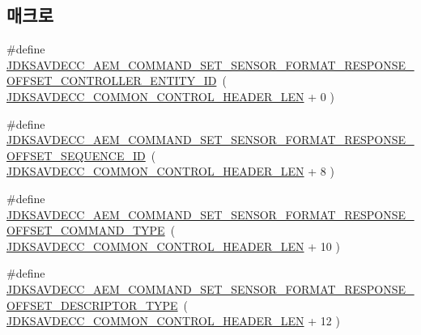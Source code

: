 \subsection*{매크로}
\begin{DoxyCompactItemize}
\item 
\#define \hyperlink{group__command__set__sensor__format__response_gacac541711e84f8ed94b1ff80926d97a6}{J\+D\+K\+S\+A\+V\+D\+E\+C\+C\+\_\+\+A\+E\+M\+\_\+\+C\+O\+M\+M\+A\+N\+D\+\_\+\+S\+E\+T\+\_\+\+S\+E\+N\+S\+O\+R\+\_\+\+F\+O\+R\+M\+A\+T\+\_\+\+R\+E\+S\+P\+O\+N\+S\+E\+\_\+\+O\+F\+F\+S\+E\+T\+\_\+\+C\+O\+N\+T\+R\+O\+L\+L\+E\+R\+\_\+\+E\+N\+T\+I\+T\+Y\+\_\+\+ID}~( \hyperlink{group__jdksavdecc__avtp__common__control__header_gaae84052886fb1bb42f3bc5f85b741dff}{J\+D\+K\+S\+A\+V\+D\+E\+C\+C\+\_\+\+C\+O\+M\+M\+O\+N\+\_\+\+C\+O\+N\+T\+R\+O\+L\+\_\+\+H\+E\+A\+D\+E\+R\+\_\+\+L\+EN} + 0 )
\item 
\#define \hyperlink{group__command__set__sensor__format__response_ga5ef0dd4de647da08fbb01a7267adff5e}{J\+D\+K\+S\+A\+V\+D\+E\+C\+C\+\_\+\+A\+E\+M\+\_\+\+C\+O\+M\+M\+A\+N\+D\+\_\+\+S\+E\+T\+\_\+\+S\+E\+N\+S\+O\+R\+\_\+\+F\+O\+R\+M\+A\+T\+\_\+\+R\+E\+S\+P\+O\+N\+S\+E\+\_\+\+O\+F\+F\+S\+E\+T\+\_\+\+S\+E\+Q\+U\+E\+N\+C\+E\+\_\+\+ID}~( \hyperlink{group__jdksavdecc__avtp__common__control__header_gaae84052886fb1bb42f3bc5f85b741dff}{J\+D\+K\+S\+A\+V\+D\+E\+C\+C\+\_\+\+C\+O\+M\+M\+O\+N\+\_\+\+C\+O\+N\+T\+R\+O\+L\+\_\+\+H\+E\+A\+D\+E\+R\+\_\+\+L\+EN} + 8 )
\item 
\#define \hyperlink{group__command__set__sensor__format__response_ga2e0d6e35a1738a777db991f0492426f8}{J\+D\+K\+S\+A\+V\+D\+E\+C\+C\+\_\+\+A\+E\+M\+\_\+\+C\+O\+M\+M\+A\+N\+D\+\_\+\+S\+E\+T\+\_\+\+S\+E\+N\+S\+O\+R\+\_\+\+F\+O\+R\+M\+A\+T\+\_\+\+R\+E\+S\+P\+O\+N\+S\+E\+\_\+\+O\+F\+F\+S\+E\+T\+\_\+\+C\+O\+M\+M\+A\+N\+D\+\_\+\+T\+Y\+PE}~( \hyperlink{group__jdksavdecc__avtp__common__control__header_gaae84052886fb1bb42f3bc5f85b741dff}{J\+D\+K\+S\+A\+V\+D\+E\+C\+C\+\_\+\+C\+O\+M\+M\+O\+N\+\_\+\+C\+O\+N\+T\+R\+O\+L\+\_\+\+H\+E\+A\+D\+E\+R\+\_\+\+L\+EN} + 10 )
\item 
\#define \hyperlink{group__command__set__sensor__format__response_ga3bb2e7b1633ba4273960ebbb753c6540}{J\+D\+K\+S\+A\+V\+D\+E\+C\+C\+\_\+\+A\+E\+M\+\_\+\+C\+O\+M\+M\+A\+N\+D\+\_\+\+S\+E\+T\+\_\+\+S\+E\+N\+S\+O\+R\+\_\+\+F\+O\+R\+M\+A\+T\+\_\+\+R\+E\+S\+P\+O\+N\+S\+E\+\_\+\+O\+F\+F\+S\+E\+T\+\_\+\+D\+E\+S\+C\+R\+I\+P\+T\+O\+R\+\_\+\+T\+Y\+PE}~( \hyperlink{group__jdksavdecc__avtp__common__control__header_gaae84052886fb1bb42f3bc5f85b741dff}{J\+D\+K\+S\+A\+V\+D\+E\+C\+C\+\_\+\+C\+O\+M\+M\+O\+N\+\_\+\+C\+O\+N\+T\+R\+O\+L\+\_\+\+H\+E\+A\+D\+E\+R\+\_\+\+L\+EN} + 12 )

\end{DoxyCompactItemize}

